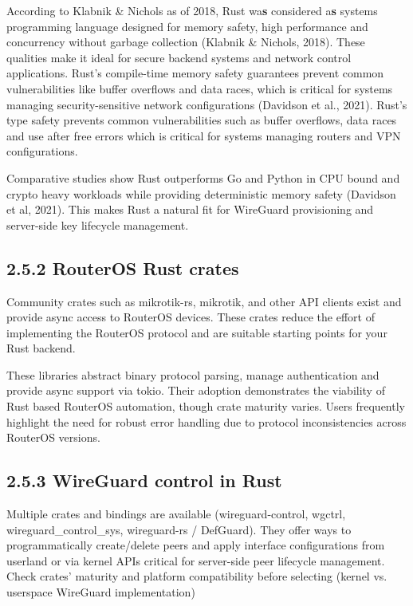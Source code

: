 \documentclass[12pt,a4paper,oneside]{report}
\begin{document}
According to Klabnik \& Nichols as of 2018, Rust wa\textbf{s }considered a\textbf{s }systems programming language designed for memory safety, high performance and concurrency without garbage collection (Klabnik \& Nichols, 2018). These qualities make it ideal for secure backend systems and network control applications. Rust's compile-time memory safety guarantees prevent common vulnerabilities like buffer overflows and data races, which is critical for systems managing security-sensitive network configurations (Davidson et al., 2021). Rust's type safety prevents common vulnerabilities such as buffer overflows, data races and use after free errors which is critical for systems managing routers and VPN configurations.


Comparative studies show Rust outperforms Go and Python in CPU bound and crypto heavy workloads while providing deterministic memory safety (Davidson et al, 2021). This makes Rust a natural fit for WireGuard provisioning and server-side key lifecycle management.




\subsection{2.5.2 RouterOS Rust crates}

Community crates such as mikrotik-rs, mikrotik, and other API clients exist and provide async access to RouterOS devices. These crates reduce the effort of implementing the RouterOS protocol and are suitable starting points for your Rust backend.


These libraries abstract binary protocol parsing, manage authentication and provide async support via tokio. Their adoption demonstrates the viability of Rust based RouterOS automation, though crate maturity varies. Users frequently highlight the need for robust error handling due to protocol inconsistencies across RouterOS versions.


\subsection{2.5.3 WireGuard control in Rust}

Multiple crates and bindings are available (wireguard-control, wgctrl, wireguard\_control\_sys, wireguard-rs / DefGuard). They offer ways to programmatically create/delete peers and apply interface configurations from userland or via kernel APIs critical for server-side peer lifecycle management. Check crates' maturity and platform compatibility before selecting (kernel vs. userspace WireGuard implementation)
\end{document}
